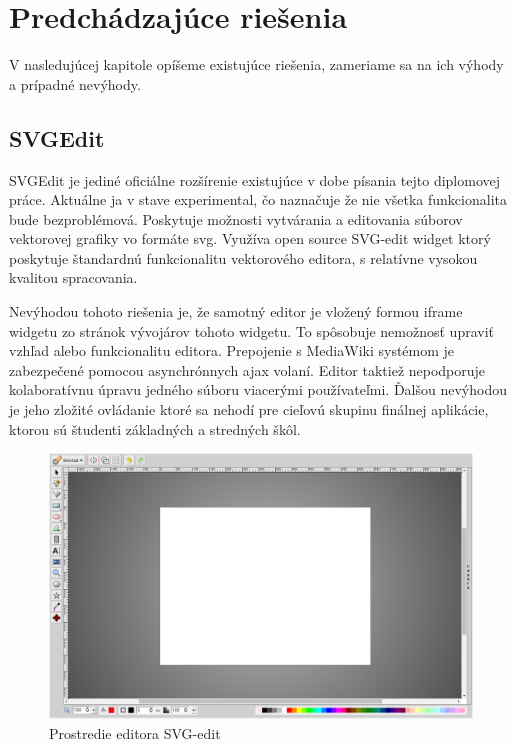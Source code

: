 \chapter{Predchádzajúce riešenia}\label{chap:previous_solutions}

V nasledujúcej kapitole opíšeme existujúce riešenia, zameriame sa na ich výhody a prípadné nevýhody.

\section{SVGEdit}

SVGEdit je jediné oficiálne rozšírenie existujúce v dobe písania tejto diplomovej práce. Aktuálne ja v stave experimental, čo naznačuje že nie všetka funkcionalita bude bezproblémová. Poskytuje možnosti vytvárania a editovania súborov vektorovej grafiky vo formáte svg. Využíva open source SVG-edit widget ktorý poskytuje štandardnú funkcionalitu vektorového editora, s relatívne vysokou kvalitou spracovania. 

Nevýhodou tohoto riešenia je, že samotný editor je vložený formou iframe widgetu zo stránok vývojárov tohoto widgetu. To spôsobuje nemožnosť upraviť vzhľad alebo funkcionalitu editora. Prepojenie s MediaWiki systémom je zabezpečené pomocou asynchrónnych ajax volaní. Editor taktiež nepodporuje kolaboratívnu úpravu jedného súboru viacerými používateľmi. Ďalšou nevýhodou je jeho zložité ovládanie ktoré sa nehodí pre cieľovú skupinu finálnej aplikácie, ktorou sú študenti základných a stredných škôl.

\begin{figure}[h]
	\centerline{\includegraphics[width=1\textwidth]{images/svg-edit}}
	\caption[Editor SVG-edit]{Prostredie editora SVG-edit}
	\label{obr:SVGedit}
\end{figure}
\FloatBarrier


